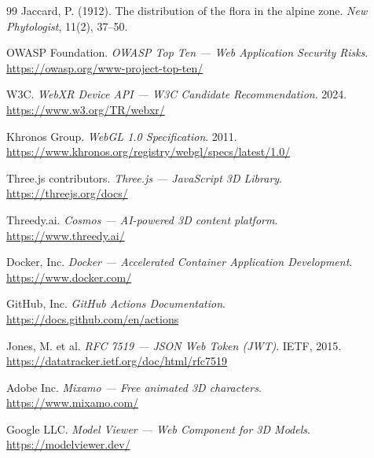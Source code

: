 \documentclass[12pt, a4paper, oneside]{report}
\begin{document}
\begin{thebibliography}{99}
Jaccard, P. (1912). The distribution of the flora in the alpine zone.
\textit{New Phytologist}, 11(2), 37--50.

OWASP Foundation. \textit{OWASP Top Ten --- Web Application Security Risks}.\\
\url{https://owasp.org/www-project-top-ten/} 

W3C. \textit{WebXR Device API --- W3C Candidate Recommendation}. 2024.\\
\url{https://www.w3.org/TR/webxr/} 

Khronos Group. \textit{WebGL 1.0 Specification}. 2011.\\
\url{https://www.khronos.org/registry/webgl/specs/latest/1.0/} 

Three.js contributors. \textit{Three.js --- JavaScript 3D Library}.\\
\url{https://threejs.org/docs/} 


Threedy.ai. \textit{Cosmos --- AI-powered 3D content platform}.\\
\url{https://www.threedy.ai/} 

Docker, Inc. \textit{Docker --- Accelerated Container Application Development}.\\
\url{https://www.docker.com/} 

GitHub, Inc. \textit{GitHub Actions Documentation}.\\
\url{https://docs.github.com/en/actions} 

Jones, M. et al. \textit{RFC 7519 --- JSON Web Token (JWT)}. IETF, 2015.\\
\url{https://datatracker.ietf.org/doc/html/rfc7519} 

Adobe Inc. \textit{Mixamo --- Free animated 3D characters}.\\
\url{https://www.mixamo.com/} 

Google LLC. \textit{Model Viewer --- Web Component for 3D Models}.\\
\url{https://modelviewer.dev/} 


\end{thebibliography}
\end{document}
